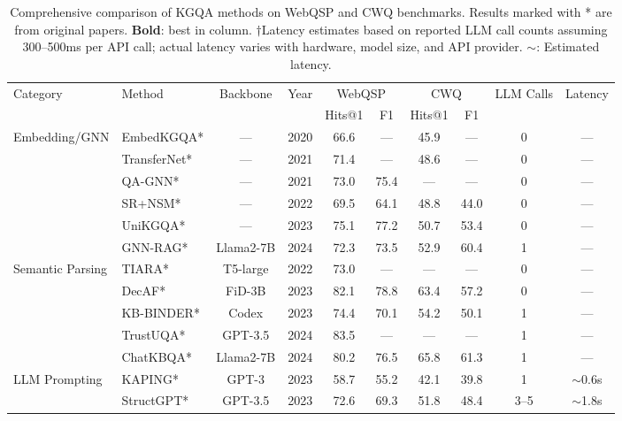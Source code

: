 \documentclass[conference]{IEEEtran}
\begin{document}
\begin{table}[t]
\centering
\caption{Comprehensive comparison of KGQA methods on WebQSP and CWQ benchmarks. Results marked with * are from original papers. \textbf{Bold}: best in column. $\dagger$Latency estimates based on reported LLM call counts assuming 300--500ms per API call; actual latency varies with hardware, model size, and API provider. $\sim$: Estimated latency.}
\label{tab:main_results}
\begin{tabular}{llcccccccc}
\toprule
\multirow{2}{*}{Category} & \multirow{2}{*}{Method} & \multirow{2}{*}{Backbone} & \multirow{2}{*}{Year} & \multicolumn{2}{c}{WebQSP} & \multicolumn{2}{c}{CWQ} & \multirow{2}{*}{LLM Calls} & \multirow{2}{*}{Latency} \\
\cmidrule(lr){5-6} \cmidrule(lr){7-8}
& & & & Hits@1 & F1 & Hits@1 & F1 & & \\
\midrule
\multirow{6}{*}{Embedding/GNN}
& EmbedKGQA* \cite{saxena2020embedkgqa} & --- & 2020 & 66.6 & --- & 45.9 & --- & 0 & --- \\
& TransferNet* \cite{shi2021transfernet} & --- & 2021 & 71.4 & --- & 48.6 & --- & 0 & --- \\
& QA-GNN* \cite{yasunaga2021qagnn} & --- & 2021 & 73.0 & 75.4 & --- & --- & 0 & --- \\
& SR+NSM* \cite{zhang2022srnsm} & --- & 2022 & 69.5 & 64.1 & 48.8 & 44.0 & 0 & --- \\
& UniKGQA* \cite{jiang2023unikgqa} & --- & 2023 & 75.1 & 77.2 & 50.7 & 53.4 & 0 & --- \\
& GNN-RAG* \cite{mavromatis2024gnnrag} & Llama2-7B & 2024 & 72.3 & 73.5 & 52.9 & 60.4 & 1 & --- \\
\midrule
\multirow{5}{*}{Semantic Parsing}
& TIARA* \cite{shu2022tiara} & T5-large & 2022 & 73.0 & --- & --- & --- & 0 & --- \\
& DecAF* \cite{yu2023decaf} & FiD-3B & 2023 & 82.1 & 78.8 & 63.4 & 57.2 & 0 & --- \\
& KB-BINDER* \cite{li2023kbbinder} & Codex & 2023 & 74.4 & 70.1 & 54.2 & 50.1 & 1 & --- \\
& TrustUQA* \cite{zhang2024trustuqa} & GPT-3.5 & 2024 & 83.5 & --- & --- & --- & 1 & --- \\
& ChatKBQA* \cite{luo2024chatkbqa} & Llama2-7B & 2024 & 80.2 & 76.5 & 65.8 & 61.3 & 1 & --- \\
\midrule
\multirow{6}{*}{LLM Prompting}
& KAPING* \cite{baek2023kaping} & GPT-3 & 2023 & 58.7 & 55.2 & 42.1 & 39.8 & 1 & $\sim$0.6s \\
& StructGPT* \cite{jiang2023structgpt} & GPT-3.5 & 2023 & 72.6 & 69.3 & 51.8 & 48.4 & 3--5 & $\sim$1.8s \\

\end{tabular}
\end{table}
\end{document}

